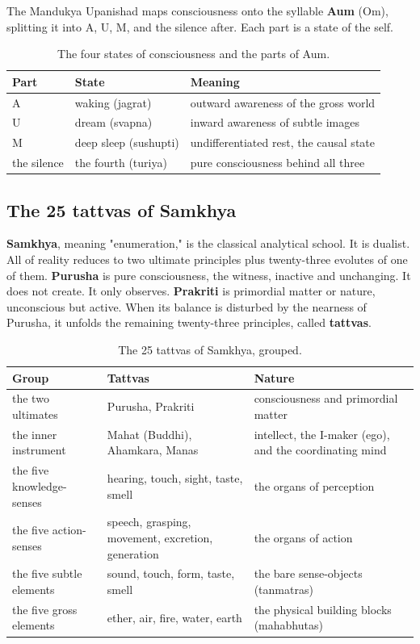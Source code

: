 The Mandukya Upanishad maps consciousness onto the syllable \textbf{Aum} (Om), splitting it into A, U, M, and the silence after. Each part is a state of the self.

\begin{longtable}{@{} L{0.18\textwidth}L{0.24\textwidth}L{0.40\textwidth}@{}}
\caption{The four states of consciousness and the parts of Aum.}\\
\toprule
\textbf{Part} & \textbf{State} & \textbf{Meaning} \\
\midrule
A & waking (jagrat) & outward awareness of the gross world \\
U & dream (svapna) & inward awareness of subtle images \\
M & deep sleep (sushupti) & undifferentiated rest, the causal state \\
the silence & the fourth (turiya) & pure consciousness behind all three \\
\bottomrule
\end{longtable}

\subsection{The 25 tattvas of Samkhya}

\textbf{Samkhya}, meaning "enumeration," is the classical analytical school. It is dualist. All of reality reduces to two ultimate principles plus twenty-three evolutes of one of them. \textbf{Purusha} is pure consciousness, the witness, inactive and unchanging. It does not create. It only observes. \textbf{Prakriti} is primordial matter or nature, unconscious but active. When its balance is disturbed by the nearness of Purusha, it unfolds the remaining twenty-three principles, called \textbf{tattvas}.

\begin{longtable}{@{} L{0.20\textwidth}L{0.30\textwidth}L{0.40\textwidth}@{}}
\caption{The 25 tattvas of Samkhya, grouped.}\\
\toprule
\textbf{Group} & \textbf{Tattvas} & \textbf{Nature} \\
\midrule
the two ultimates & Purusha, Prakriti & consciousness and primordial matter \\
the inner instrument & Mahat (Buddhi), Ahamkara, Manas & intellect, the I-maker (ego), and the coordinating mind \\
the five knowledge-senses & hearing, touch, sight, taste, smell & the organs of perception \\
the five action-senses & speech, grasping, movement, excretion, generation & the organs of action \\
the five subtle elements & sound, touch, form, taste, smell & the bare sense-objects (tanmatras) \\
the five gross elements & ether, air, fire, water, earth & the physical building blocks (mahabhutas) \\
\bottomrule
\end{longtable}

